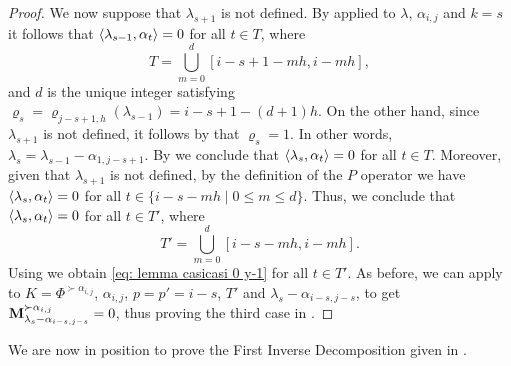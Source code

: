 \begin{proof}
   We now  suppose that $\lambda_{s+1}$ is not defined.  
    By  applied to $\lambda$, $\alpha_{i,j}$ and $k=s$ it follows that $\langle \lambda_{s-1} , \alpha_{t} \rangle = 0$ for all $t\in T$, where
    \begin{equation}
        T=\bigcup_{m=0}^{d}[i-s+1-mh,i-mh],
    \end{equation}
    and $d$ is the unique integer satisfying $\varrho_{s} = \varrho_{j-s+1,h}(\lambda_{s-1}) = i-s+1-(d+1)h$.
    On the other hand, since $\lambda_{s+1}$ is not defined, it follows by  that $\varrho_{s} = 1$.
    In other words, $\lambda_{s} = \lambda_{s-1} -\alpha_{1,j-s+1}$.
   By  we conclude that $\langle \lambda_{s} , \alpha_{t} \rangle=0$ for all $t\in T$.
    Moreover, given that $\lambda_{s+1}$ is not defined, by the definition of the  $P$ operator we have  $\langle \lambda_{s} , \alpha_{t} \rangle =0$ for all $t\in \{i-s-mh\mid 0\leq m\leq d\}$.
    Thus, we conclude that $\langle \lambda_{s} , \alpha_{t} \rangle =0$ for all $t\in T'$, where
    \begin{equation}
        T'=\bigcup_{m=0}^{d} [i-s-mh,i-mh].
    \end{equation} 
 Using  we obtain \eqref{eq: lemma casicasi 0 y-1} for all $t\in T'$. 
 As before, we can apply  to $K=\Phi^{\succ \alpha_{i,j}}$, $\alpha_{i,j}$, $p=p'=i-s$, $T'$ and $\lambda_{s}-\alpha_{i-s,j-s}$, to get $\mathbf{M}_{\lambda_{s}-\alpha_{i-s,j-s}}^{\succ \alpha_{i,j}}=0$, thus proving the third case in . 
\end{proof}

We are now in position to prove the First Inverse Decomposition given in . 


